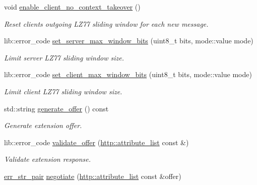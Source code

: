 \begin{DoxyCompactItemize}
void \mbox{\hyperlink{classwebsocketpp_1_1extensions_1_1permessage__deflate_1_1enabled_a21e8e0200cab9dd276842ce9ecbd6639}{enable\+\_\+client\+\_\+no\+\_\+context\+\_\+takeover}} ()
\begin{DoxyCompactList}\small\item\em Reset client\textquotesingle{}s outgoing L\+Z77 sliding window for each new message. \end{DoxyCompactList}\item 
lib\+::error\+\_\+code \mbox{\hyperlink{classwebsocketpp_1_1extensions_1_1permessage__deflate_1_1enabled_ac2f1bd776c26b4d54afaceded1841394}{set\+\_\+server\+\_\+max\+\_\+window\+\_\+bits}} (uint8\+\_\+t bits, mode\+::value mode)
\begin{DoxyCompactList}\small\item\em Limit server L\+Z77 sliding window size. \end{DoxyCompactList}\item 
lib\+::error\+\_\+code \mbox{\hyperlink{classwebsocketpp_1_1extensions_1_1permessage__deflate_1_1enabled_a5bfcf29752865c0e9c8e8092ee21b5af}{set\+\_\+client\+\_\+max\+\_\+window\+\_\+bits}} (uint8\+\_\+t bits, mode\+::value mode)
\begin{DoxyCompactList}\small\item\em Limit client L\+Z77 sliding window size. \end{DoxyCompactList}\item 
std\+::string \mbox{\hyperlink{classwebsocketpp_1_1extensions_1_1permessage__deflate_1_1enabled_adc342a368792f5beee8dddbbc5981846}{generate\+\_\+offer}} () const
\begin{DoxyCompactList}\small\item\em Generate extension offer. \end{DoxyCompactList}\item 
lib\+::error\+\_\+code \mbox{\hyperlink{classwebsocketpp_1_1extensions_1_1permessage__deflate_1_1enabled_acf45724e34c174a0b8a5166192f659de}{validate\+\_\+offer}} (\mbox{\hyperlink{namespacewebsocketpp_1_1http_a9744f4104772b987aa9e86c35ce1357b}{http\+::attribute\+\_\+list}} const \&)
\begin{DoxyCompactList}\small\item\em Validate extension response. \end{DoxyCompactList}\item 
\mbox{\hyperlink{namespacewebsocketpp_abecf95d53c9387716b157daae84441f3}{err\+\_\+str\+\_\+pair}} \mbox{\hyperlink{classwebsocketpp_1_1extensions_1_1permessage__deflate_1_1enabled_aa05eda4f6a0231c13708445480181ff4}{negotiate}} (\mbox{\hyperlink{namespacewebsocketpp_1_1http_a9744f4104772b987aa9e86c35ce1357b}{http\+::attribute\+\_\+list}} const \&offer)

\end{DoxyCompactItemize}
